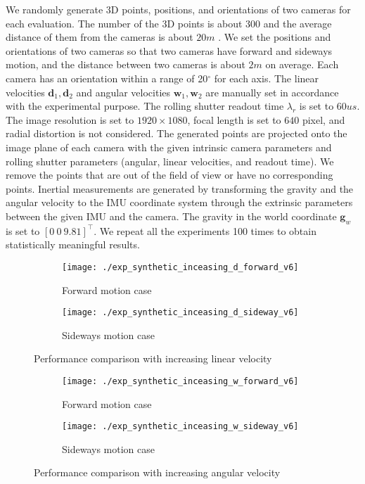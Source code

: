 \documentclass[10pt,twocolumn,letterpaper]{article}
\theoremstyle{definition}
\begin{document}
	We randomly generate 3D points, positions, and orientations of two cameras for each evaluation.
	The number of the 3D points is about $300$ and the average distance of them from the cameras is about $20m$ .
	We set the positions and orientations of two cameras so that two cameras have forward and sideways motion, and the distance between two cameras is about $2m$ on average.
	Each camera %
	has an orientation within a range of 20$^{\circ}$ for each axis.
	The linear velocities $\mathbf{d}_1,\mathbf{d}_2$ and angular velocities $\mathbf{w}_1, \mathbf{w}_2$ are manually set in accordance with the experimental purpose.
	The rolling shutter readout time $\lambda_{r}$ is set to $60 us$.
	The image resolution is set to $1920 \times 1080$, focal length is set to $640$ pixel, and radial distortion is not considered.
	The generated points are projected onto the image plane of each camera with the given intrinsic camera parameters and rolling shutter parameters (angular, linear velocities, and readout time).
	We remove the points that are out of the field of view or have no corresponding points.
	Inertial measurements are generated by transforming the gravity and the angular velocity to the IMU coordinate system through the extrinsic parameters between the given IMU and the camera.
	The gravity in the world coordinate $\mathbf{g}_{w}$ is set to $[0 \ 0 \ 9.81]^{\top}$.
	We repeat all the experiments 100 times to obtain statistically meaningful results.
	
	\begin{figure}[t]
		\begin{subfigure}[b]{0.99\linewidth}
			\texttt{[image: ./exp\_synthetic\_inceasing\_d\_forward\_v6]}
			\caption{Forward motion case}
		\end{subfigure}
		\begin{subfigure}[b]{0.99\linewidth}
			\texttt{[image: ./exp\_synthetic\_inceasing\_d\_sideway\_v6]}
			\caption{Sideways motion case}
		\end{subfigure}%
		\caption{Performance comparison with increasing linear velocity}
		\label{fig:exp_synthetic_rs_d}		
	\end{figure}
	
	\begin{figure}[t]
		\begin{subfigure}[b]{0.99\linewidth}
			\texttt{[image: ./exp\_synthetic\_inceasing\_w\_forward\_v6]}
			
			\caption{Forward motion case}
		\end{subfigure}
		\begin{subfigure}[b]{0.99\linewidth}
			\texttt{[image: ./exp\_synthetic\_inceasing\_w\_sideway\_v6]}
			\caption{Sideways motion case}
		\end{subfigure}%
		\caption{Performance comparison with increasing angular velocity}
		\label{fig:exp_synthetic_rs_w}
	\end{figure}
	
\end{document}
